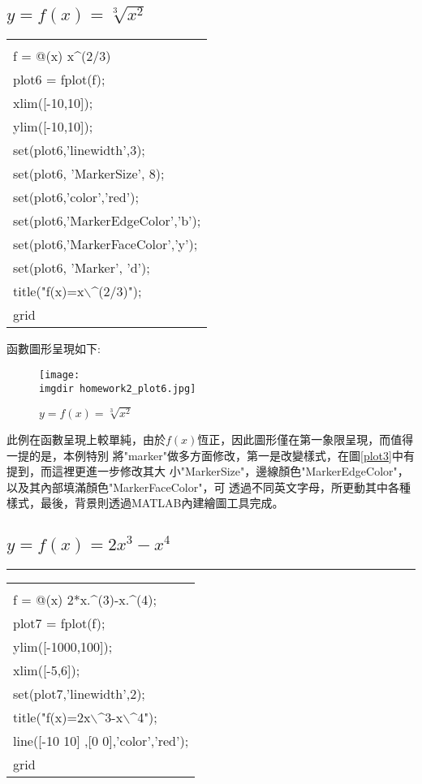 		\subsection{$y=f(x)=\sqrt[3]{x^2}$}%
		\begin{center}\colorbox{slight}{
				\begin{tabular}{p{}}
					\MJHmarker{\textbf{MATLAB語法 :}}\\					
					f = @(x) x$\^$(2/3)\\
					plot6 = fplot(f);\\
					xlim([-10,10]);\\
					ylim([-10,10]);\\
					set(plot6,'linewidth',3);\\
					set(plot6, 'MarkerSize', 8);\\ 
					set(plot6,'color','red');\\
					set(plot6,'MarkerEdgeColor','b');\\
					set(plot6,'MarkerFaceColor','y');\\
					set(plot6, 'Marker', 'd');\\
					title("f(x)=x$\backslash\^$(2/3)");\\
					grid
				\end{tabular}
			}
			\end{center}	
		函數圖形呈現如下:	
		\begin{figure}[H]	
		 	 \centering	 			 	 
   			 \texttt{[image: \\imgdir homework2\_plot6.jpg]} 
   			 \caption{$y=f(x)=\sqrt[3]{x^2}$}   		
   			 \label{plot6}   			 		 
		\end{figure}
		\bigskip
		此例在函數呈現上較單純，由於$f(x)$恆正，因此圖形僅在第一象限呈現，而值得一提的是，本例特別			將"marker"做多方面修改，第一是改變樣式，在圖\ref{plot3}中有提到，而這裡更進一步修改其大			小"MarkerSize"，邊線顏色"MarkerEdgeColor"，以及其內部填滿顏色"MarkerFaceColor"，可			透過不同英文字母，所更動其中各種樣式，最後，背景則透過MATLAB內建繪圖工具完成。
		
		\subsection{$y=f(x)=2x^3-x^4$}%
		\rule{\textwidth}{0.2pt}
		\begin{center}\colorbox{slight}{
				\begin{tabular}{p{}}
					\MJHmarker{\textbf{MATLAB語法 :}}\\					
					f = @(x) 2*x.$\^$(3)-x.$\^$(4);\\
					plot7 = fplot(f);\\
					ylim([-1000,100]);\\
					xlim([-5,6]);\\
					set(plot7,'linewidth',2);\\
					title("f(x)=2x$\backslash\^$3-x$\backslash\^$4");\\
					line([-10 10] ,[0 0],'color','red');\\
					grid
				\end{tabular}
			}
			\end{center}			
		
